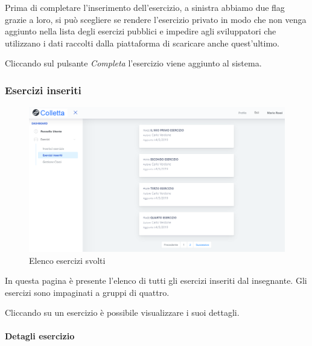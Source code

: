          Prima di completare l'inserimento dell'esercizio, a sinistra abbiamo due flag grazie a loro, si può scegliere se rendere l'esercizio privato in modo che non venga aggiunto  nella lista degli esercizi pubblici e impedire agli sviluppatori che utilizzano i dati raccolti dalla piattaforma di scaricare anche quest'ultimo. 
          
            Cliccando sul pulsante \textit{Completa} l'esercizio viene aggiunto al sistema.
          
\subsubsection{Esercizi inseriti}
\begin{figure}[H]
            	\centering
        		\includegraphics[width=17cm]{sez/img/insegnante/eserinseriti.PNG} 
            	\caption{Elenco esercizi svolti}\label{fig:1}
        	\end{figure}  
        	In questa pagina è presente l'elenco di tutti gli esercizi inseriti dal insegnante. Gli esercizi sono impaginati a gruppi di quattro.
        	
        	 Cliccando su un esercizio è possibile visualizzare i suoi dettagli.               
\newpage
\paragraph{Detagli esercizio}\mbox{}\\   

